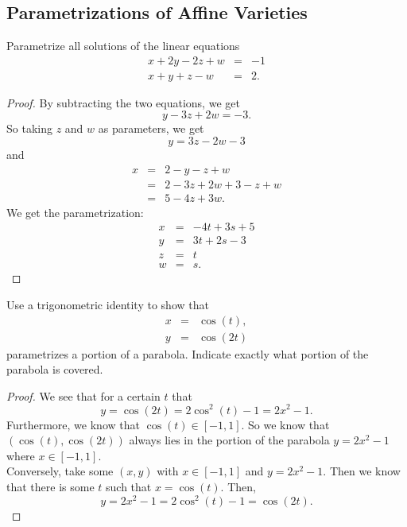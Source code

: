 \subsection{Parametrizations of Affine Varieties}
\begin{exercise}{1}
Parametrize all solutions of the linear equations
\begin{eqnarray*}
    x + 2y - 2z + w & = & -1\\
    x + y + z - w & = & 2.
\end{eqnarray*}
\end{exercise}
\begin{proof}
    By subtracting the two equations, we get
    $$y - 3z + 2w = -3.$$
    So taking $z$ and $w$ as parameters, we get
    $$y = 3z - 2w - 3$$
    and
    \begin{eqnarray*}
        x
        & = & 2 - y - z +w\\
        & = & 2 -3z +2w + 3 -z + w\\
        & = & 5 - 4z + 3w.
    \end{eqnarray*}
    We get the parametrization:
    \begin{eqnarray*}
        x & = & -4t + 3s + 5\\
        y & = & 3t + 2s - 3\\
        z & = & t\\
        w & = & s.
    \end{eqnarray*}
\end{proof}

\begin{exercise}{2}
    Use a trigonometric identity to show that
    \begin{eqnarray*}
        x & = & \cos(t),\\
        y & = & \cos(2t)
    \end{eqnarray*}
    parametrizes a portion of a parabola. Indicate exactly what portion of the parabola is covered.
\end{exercise}
\begin{proof}
    We see that for a certain $t$ that
    $$y = \cos(2t) = 2\cos^2(t) - 1 = 2x^2 - 1.$$
    Furthermore, we know that $\cos(t)\in [-1,1]$. So we know that $(\cos(t), \cos(2t))$ always lies in the portion of the parabola $y = 2x^2 -1$ where $x\in [-1,1]$.\\
    Conversely, take some $(x,y)$ with $x\in [-1,1]$ and $y = 2x^2 - 1$. Then we know that there is some $t$ such that $x=\cos(t)$. Then,
    $$y = 2x^2 - 1 = 2\cos^2(t) - 1 = \cos(2t).$$
\end{proof}

